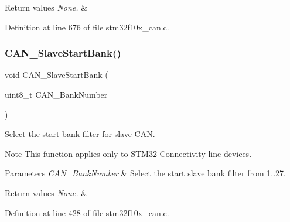 \begin{DoxyRetVals}{Return values}
{\em None.} & \\
\hline
\end{DoxyRetVals}


Definition at line 676 of file stm32f10x\+\_\+can.\+c.

\mbox{\label{group___c_a_n___private___functions_ga109ff8960bc59f44b984c9646f17b3c0}} 
\subsubsection{\texorpdfstring{C\+A\+N\+\_\+\+Slave\+Start\+Bank()}{CAN\_SlaveStartBank()}}
{\footnotesize\ttfamily void C\+A\+N\+\_\+\+Slave\+Start\+Bank (\begin{DoxyParamCaption}\item[{uint8\+\_\+t}]{C\+A\+N\+\_\+\+Bank\+Number }\end{DoxyParamCaption})}



Select the start bank filter for slave C\+AN. 

\begin{DoxyNote}{Note}
This function applies only to S\+T\+M32 Connectivity line devices. 
\end{DoxyNote}

\begin{DoxyParams}{Parameters}
{\em C\+A\+N\+\_\+\+Bank\+Number} & Select the start slave bank filter from 1..27. \\
\hline
\end{DoxyParams}

\begin{DoxyRetVals}{Return values}
{\em None.} & \\
\hline
\end{DoxyRetVals}


Definition at line 428 of file stm32f10x\+\_\+can.\+c.

\mbox{\label{group___c_a_n___private___functions_ga640215e38765759d7eceb8a039046667}} 
